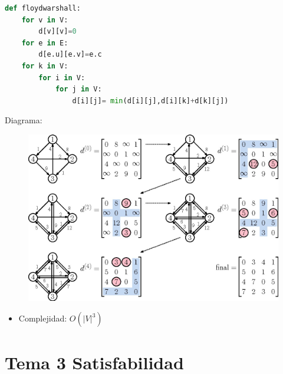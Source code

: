 \documentclass[12pt, twoside, openright]{report} %
\begin{document}
\begin{lstlisting}[language=Python]
def floydwarshall:
	for v in V:
		d[v][v]=0
	for e in E:
		d[e.u][e.v]=e.c
	for k in V:
		for i in V: 
			for j in V:
				d[i][j]= min(d[i][j],d[i][k]+d[k][j])
\end{lstlisting}

  Diagrama:
  \begin{figure}[H]
	{\includegraphics[scale=.3]{2A6EA3F5-5BA5-4FDB-9D83-EB572452B3AB.jpeg}}
\end{figure}
  \begin{itemize}
  \item Complejidad: \(O(|V|^3)\)
  \end{itemize}
  

\chapter{Tema 3 Satisfabilidad}
\end{document}
